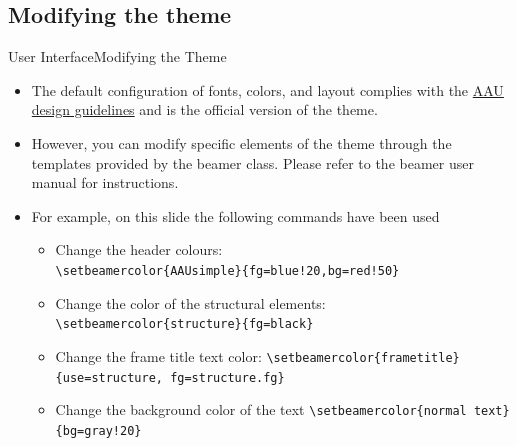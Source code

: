 \documentclass[10pt]{beamer}
\newcommand{\chref}[2]{%
  \href{#1}{{\usebeamercolor[bg]{AAUsimple}#2}}%
}
\begin{document}
\subsection{Modifying the theme}
{
\begin{frame}{User Interface}{Modifying the Theme}
  \begin{itemize}
    \item<1-> The default configuration of fonts, colors, and layout complies with the \chref{http://aau.designguides.dk}{AAU design guidelines} and is the \alert{official} version of the theme.
    \item<2-> However, you can modify specific elements of the theme through the templates provided by the beamer class. Please refer to the beamer user manual for instructions.
    \item<3-> For example, on this slide the following commands have been used
      \begin{itemize}
        \item Change the header colours:\\
        {\tt \textbackslash setbeamercolor\{AAUsimple\}\{fg=blue!20,bg=red!50\}}
        \item Change the color of the structural elements:\\
        {\tt \textbackslash setbeamercolor\{structure\}\{fg=black\}}\\
        \item Change the frame title text color:
        {\tt \textbackslash setbeamercolor\{frametitle\}\{use=structure, fg=structure.fg\}}
        \item Change the background color of the text
        {\tt \textbackslash setbeamercolor\{normal text\}\{bg=gray!20\}}
      \end{itemize}
  \end{itemize}
\end{frame}}
\end{document}
